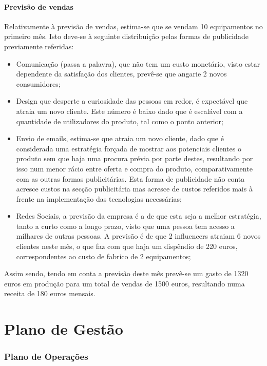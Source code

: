 \documentclass[a4paper]{article}
\begin{document}
\subsection{Previsão de vendas}
Relativamente à previsão de vendas, estima-se que se vendam 10 equipamentos no primeiro mês. Isto deve-se à seguinte distribuição pelas formas de publicidade previamente referidas:
\begin{itemize}
    \item Comunicação (passa a palavra), que não tem um custo monetário, visto estar dependente da satisfação dos clientes, prevê-se que angarie 2 novos consumidores;
    \item Design que desperte a curiosidade das pessoas em redor, é expectável que atraia um novo cliente. Este número é baixo dado que é escalável com a quantidade de utilizadores do produto, tal como o ponto anterior;
    \item Envio de emails, estima-se que atraia um novo cliente, dado que é considerada uma estratégia forçada de mostrar aos potenciais clientes o produto sem que haja uma procura prévia por parte destes, resultando por isso num menor rácio entre oferta e compra do produto, comparativamente com as outras formas publicitárias. Esta forma de publicidade não conta acresce custos na secção publicitária mas acresce de custos referidos mais à frente na implementação das tecnologias necessárias;
    \item Redes Sociais, a previsão da empresa é a de que esta seja a melhor estratégia, tanto a curto como a longo prazo, visto que uma pessoa tem acesso a milhares de outras pessoas. A previsão é de que 2 influencers atraiam 6 novos clientes neste mês, o que faz com que haja um dispêndio de 220 euros, correspondentes ao custo de fabrico de 2 equipamentos;
\end{itemize}
Assim sendo, tendo em conta a previsão deste mês prevê-se um gasto de 1320 euros em produção para um total de vendas de 1500 euros, resultando numa receita de 180 euros mensais.

\part{Plano de Gestão} 
\section{Plano de Operações}
\end{document}
